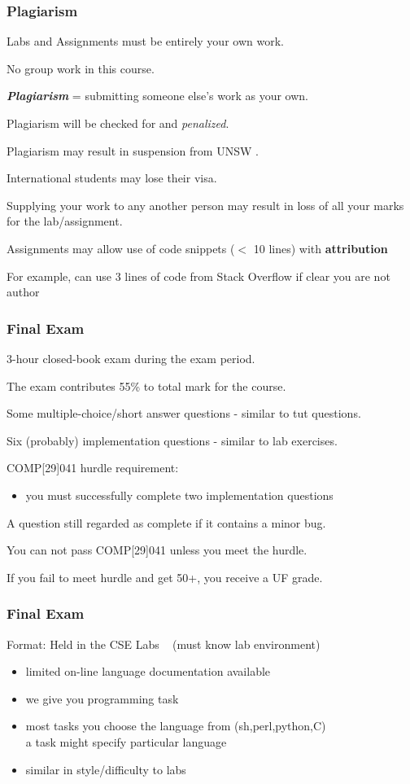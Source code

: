\begin{frame}
\frametitle{Plagiarism}
Labs and Assignments must be entirely your own work.

No group work in this course.

{\em{{\bf{Plagiarism}}}} = {\small submitting someone else's work as your own.}

Plagiarism will be checked for and {\em{penalized}}.

Plagiarism may result in suspension from UNSW .

International students may lose their visa.

Supplying your work to any another person  may result in 
loss of all your marks for the lab/assignment.

Assignments may allow use of code snippets ($<$ 10 lines)
with {\bf attribution}

For example, can use 3 lines of code from Stack Overflow if clear you are not author
\end{frame}

\begin{frame}
\frametitle{Final Exam}
3-hour closed-book exam during the exam period.

The exam contributes 55\% to total mark for the course.

Some multiple-choice/short answer questions - similar to  tut questions.

Six (probably) implementation questions  - similar to lab exercises.

COMP[29]041 hurdle requirement:

\begin{itemize}
\item you must successfully complete two implementation questions
\end{itemize}

A question still regarded as complete if it contains a minor bug.

You can not pass COMP[29]041 unless you meet the hurdle.

If you fail to meet  hurdle and get 50+, you receive a UF grade.
\end{frame}

\begin{frame}
\frametitle{Final Exam}
Format:
Held in the CSE Labs ~ {\small (must know lab environment)}

\begin{itemize}
\item  limited on-line language documentation available
\item  we give you  programming task
\item  most tasks you choose the language from (sh,perl,python,C) \\
a task might specify particular language
\item  similar in style/difficulty to labs
\end{itemize}
\end{frame}



